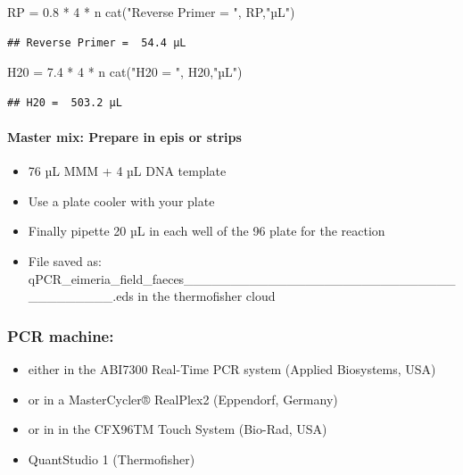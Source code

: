 \documentclass[
]{article}
\newenvironment{Shaded}{\begin{snugshade}}{\end{snugshade}}
\newcommand{\DecValTok}[1]{\textcolor[rgb]{0.00,0.00,0.81}{#1}}
\newcommand{\FloatTok}[1]{\textcolor[rgb]{0.00,0.00,0.81}{#1}}
\newcommand{\FunctionTok}[1]{\textcolor[rgb]{0.00,0.00,0.00}{#1}}
\newcommand{\NormalTok}[1]{#1}
\newcommand{\OtherTok}[1]{\textcolor[rgb]{0.56,0.35,0.01}{#1}}
\newcommand{\SpecialCharTok}[1]{\textcolor[rgb]{0.00,0.00,0.00}{#1}}
\newcommand{\StringTok}[1]{\textcolor[rgb]{0.31,0.60,0.02}{#1}}
\providecommand{\tightlist}{%
  \setlength{\itemsep}{0pt}\setlength{\parskip}{0pt}}
\begin{document}
\begin{Shaded}
\begin{Highlighting}[]
\NormalTok{RP }\OtherTok{=} \FloatTok{0.8} \SpecialCharTok{*} \DecValTok{4} \SpecialCharTok{*}\NormalTok{ n}
\FunctionTok{cat}\NormalTok{(}\StringTok{"Reverse Primer = "}\NormalTok{, RP,}\StringTok{"µL"}\NormalTok{)}
\end{Highlighting}
\end{Shaded}

\begin{verbatim}
## Reverse Primer =  54.4 µL
\end{verbatim}

\begin{Shaded}
\begin{Highlighting}[]
\NormalTok{H20 }\OtherTok{=} \FloatTok{7.4} \SpecialCharTok{*} \DecValTok{4} \SpecialCharTok{*}\NormalTok{ n}
\FunctionTok{cat}\NormalTok{(}\StringTok{"H20 = "}\NormalTok{, H20,}\StringTok{"µL"}\NormalTok{)}
\end{Highlighting}
\end{Shaded}

\begin{verbatim}
## H20 =  503.2 µL
\end{verbatim}

\hypertarget{master-mix-prepare-in-epis-or-strips}{%
\paragraph{Master mix: Prepare in epis or
strips}\label{master-mix-prepare-in-epis-or-strips}}

\begin{itemize}
\tightlist
\item
  76 µL MMM + 4 µL DNA template
\item
  Use a plate cooler with your plate
\item
  Finally pipette 20 µL in each well of the 96 plate for the reaction
\item
  File saved as:
  qPCR\_eimeria\_field\_faeces\_\_\_\_\_\_\_\_\_\_\_\_\_\_\_\_\_\_\_\_\_\_\_\_\_\_\_\_\_\_\_\_\_\_\_\_\_\_.eds
  in the thermofisher cloud
\end{itemize}

\hypertarget{pcr-machine}{%
\subsubsection{PCR machine:}\label{pcr-machine}}

\begin{itemize}
\tightlist
\item
  either in the ABI7300 Real-Time PCR system (Applied Biosystems, USA)
\item
  or in a MasterCycler® RealPlex2 (Eppendorf, Germany)
\item
  or in in the CFX96TM Touch System (Bio-Rad, USA)
\item
  QuantStudio 1 (Thermofisher)
\end{itemize}
\end{document}
